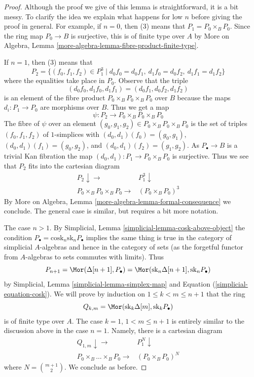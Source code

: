 \begin{proof}
Although the proof we give of this lemma is straightforward, it is a bit
messy. To clarify the idea we explain what happens for low $n$ before giving
the proof in general. For example, if $n = 0$, then (3) means that
$P_1 = P_0 \times_B P_0$. Since the ring map $P_0 \to B$ is surjective, this
is of finite type over $A$ by
More on Algebra, Lemma \ref{more-algebra-lemma-fibre-product-finite-type}.

\medskip\noindent
If $n = 1$, then (3) means that
$$
P_2 = \{(f_0, f_1, f_2) \in P_1^3 \mid
d_0f_0 = d_0f_1,\ d_1f_0 = d_0f_2,\ d_1f_1 = d_1f_2 \}
$$
where the equalities take place in $P_0$. Observe that the triple
$$
(d_0f_0, d_1f_0, d_1f_1) = (d_0f_1, d_0f_2, d_1f_2)
$$
is an element of the fibre product $P_0 \times_B P_0 \times_B P_0$ over $B$
because the maps $d_i : P_1 \to P_0$ are morphisms over $B$. Thus we get
a map
$$
\psi : P_2 \longrightarrow P_0 \times_B P_0 \times_B P_0
$$
The fibre of $\psi$ over an element
$(g_0, g_1, g_2) \in P_0 \times_B P_0 \times_B P_0$
is the set of triples $(f_0, f_1, f_2)$ of $1$-simplices
with $(d_0, d_1)(f_0) = (g_0, g_1)$, $(d_0, d_1)(f_1) = (g_0, g_2)$,
and $(d_0, d_1)(f_2) = (g_1, g_2)$. As $P_\bullet \to B$ is a trivial
Kan fibration the map $(d_0, d_1) : P_1 \to P_0 \times_B P_0$ is
surjective. Thus we see that $P_2$ fits into the cartesian diagram
$$
\begin{array}{cc}P_2 \downarrow\longrightarrow & P_1^3 \downarrow \\ P_0 \times_B P_0 \times_B P_0 \longrightarrow & (P_0 \times_B P_0)^3\end{array}
$$
By More on Algebra, Lemma \ref{more-algebra-lemma-formal-consequence}
we conclude. The general case is similar, but requires a bit more notation.

\medskip\noindent
The case $n > 1$. By Simplicial, Lemma \ref{simplicial-lemma-cosk-above-object}
the condition $P_\bullet = \text{cosk}_n \text{sk}_n P_\bullet$
implies the same thing is true in the category of simplicial
$A$-algebras and hence in the category of sets (as the forgetful
functor from $A$-algebras to sets commutes with limits). Thus
$$
P_{n + 1} =
\Mor(\Delta[n + 1], P_\bullet) =
\Mor(\text{sk}_n \Delta[n + 1], \text{sk}_n P_\bullet)
$$
by Simplicial, Lemma \ref{simplicial-lemma-simplex-map} and
Equation (\ref{simplicial-equation-cosk}). We will prove by induction
on $1 \leq k < m \leq n + 1$ that the ring
$$
Q_{k, m} = \Mor(\text{sk}_k \Delta[m], \text{sk}_k P_\bullet)
$$
is of finite type over $A$. The case $k = 1$, $1 < m \leq n + 1$
is entirely similar to the discussion above in the case $n = 1$.
Namely, there is a cartesian diagram
$$
\begin{array}{cc}Q_{1, m} \downarrow\longrightarrow & P_1^N \downarrow \\ P_0 \times_B \ldots \times_B P_0 \longrightarrow & (P_0 \times_B P_0)^N\end{array}
$$
where $N = {m + 1 \choose 2}$. We conclude as before.


\end{proof}
